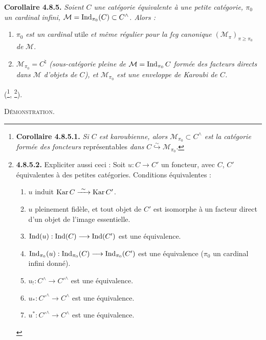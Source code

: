 \textbf{Corollaire 4.8.5.} \textit{Soient $C$ une catégorie équivalente à une petite catégorie, $\pi_0$ un cardinal infini, $\mathcal{M}=\operatorname{Ind}_{\pi_0}(C)\subset C^\wedge$. Alors :}
\begin{enumerate}
\item[\textit{1$^\circ$)}] $\pi_0$ \textit{est un cardinal} utile \textit{et même régulier pour la fcg canonique} $(\mathcal{M}_\pi)_{\pi\geqslant\pi_0}$ \textit{de} $\mathcal{M}$.
\item[\textit{2$^\circ$)}] $\mathcal{M}_{\pi_0}=C^\natural$ \textit{(sous-catégorie pleine de $\mathcal{M}=\operatorname{Ind}_{\pi_0}C$ formée des facteurs directs dans $\mathcal{M}$ d'objets de $C$), et $\mathcal{M}_{\pi_0}$ est une enveloppe de Karoubi de $C$.}
\end{enumerate}
(\footnote{\textbf{Corollaire 4.8.5.1.} \textit{Si $C$ est karoubienne, alors $\mathcal{M}_{\pi_0}\subset C^\wedge$ est la catégorie formée des foncteurs} représentables \textit{dans} $C\overset{\sim}{\hookrightarrow}\mathcal{M}_{\pi_0}$.}, \footnote{\textbf{4.8.5.2.} Expliciter aussi ceci : Soit $u : C\longrightarrow C'$ un foncteur, avec $C$, $C'$ équivalentes à des petites catégories. Conditions équivalentes :
\begin{enumerate}
\item[a)] $u$ induit $\operatorname{Kar} C\xrightarrow{\ \sim\ }\operatorname{Kar} C'$.
\item[a$'$)] $u$ pleinement fidèle, et tout objet de $C'$ est isomorphe à un facteur direct d'un objet de l'image essentielle.
\item[b)] $\operatorname{Ind}(u) : \operatorname{Ind}(C)\longrightarrow\operatorname{Ind}(C')$ est une équivalence.
\item[c)] $\operatorname{Ind}_{\pi_0}(u) : \operatorname{Ind}_{\pi_0}(C)\longrightarrow\operatorname{Ind}_{\pi_0}(C')$ est une équivalence ($\pi_0$ un cardinal infini donné).
\item[d)] $u_! : C^\wedge\longrightarrow C'^\wedge$ est une équivalence.
\item[d$'$)] $u_* : C'^\wedge\longrightarrow C^\wedge$ est une équivalence.
\item[d$''$)] $u^* : C'^\wedge\longrightarrow C^\wedge$ est une équivalence.
\end{enumerate}}).


\textsc{Démonstration.}

